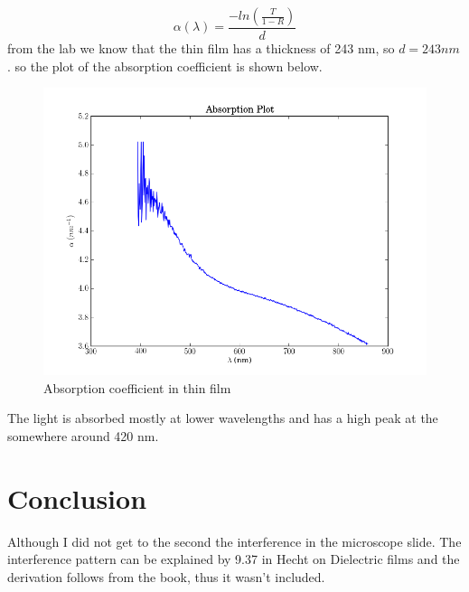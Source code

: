 \documentclass[paper=a4, fontsize=11pt]{scrartcl} %
\numberwithin{equation}{section}
\numberwithin{figure}{section}
\numberwithin{table}{section}
\begin{document}
\begin{equation}
\alpha(\lambda) = \frac{-ln(\frac{T}{1-R})}{d}
\end{equation}
from the lab we know that the thin film has a thickness of 243 nm, so $d = 243 nm$.
so the plot of the absorption coefficient is shown below.
\begin{figure}[H]
\centering
\includegraphics[scale =0.3]{abs}
\caption{Absorption coefficient in thin film}
\end{figure}
The light is absorbed mostly at lower wavelengths and has a high peak at the somewhere around 420 nm. 
\section{Conclusion}
Although I did not get to the second the interference in the microscope slide. The interference pattern can be explained by 9.37 in Hecht on Dielectric films and the derivation follows from the book, thus it wasn't included.
\end{document}
